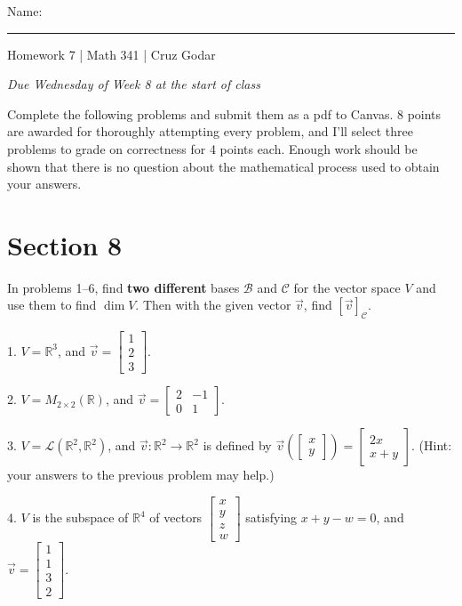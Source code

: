 \documentclass{article}
\begin{document}
\Large Name: \rule{2in}{0.15mm} \hfill Homework 7 | Math 341 | Cruz Godar \vspace{4pt}  \normalsize

\textit{Due Wednesday of Week 8 at the start of class}

Complete the following problems and submit them as a pdf to Canvas. 8 points are awarded for thoroughly attempting every problem, and I'll select three problems to grade on correctness for 4 points each. Enough work should be shown that there is no question about the mathematical process used to obtain your answers.

\section{Section 8}

In problems 1--6, find \textbf{two different} bases $\mathcal{B}$ and $\mathcal{C}$ for the vector space $V$ and use them to find $\dim V$. Then with the given vector $\vec{v}$, find $[\vec{v}]_\mathcal{C}$.

1. $V = \mathbb{R}^3$, and $\vec{v} = \left[\begin{array}{c} 1 \\ 2 \\ 3 \end{array}\right]$.

2. $V = M_{2 \times 2}(\mathbb{R})$, and $\vec{v} = \left[\begin{array}{cc} 2& -1 \\ 0& 1 \end{array}\right]$.

3. $V = \mathcal{L}(\mathbb{R}^2, \mathbb{R}^2)$, and $\vec{v}:\mathbb{R}^2 \to \mathbb{R}^2$ is defined by $\vec{v}\left( \left[\begin{array}{c} x \\ y \end{array}\right] \right) = \left[\begin{array}{c} 2x \\ x + y \end{array}\right]$. (Hint: your answers to the previous problem may help.)

4. $V$ is the subspace of $\mathbb{R}^4$ of vectors $\left[\begin{array}{c} x \\ y \\ z \\ w \end{array}\right]$ satisfying $x + y - w = 0$, and $\vec{v} = \left[\begin{array}{c} 1 \\ 1 \\ 3 \\ 2 \end{array}\right]$.
\end{document}
